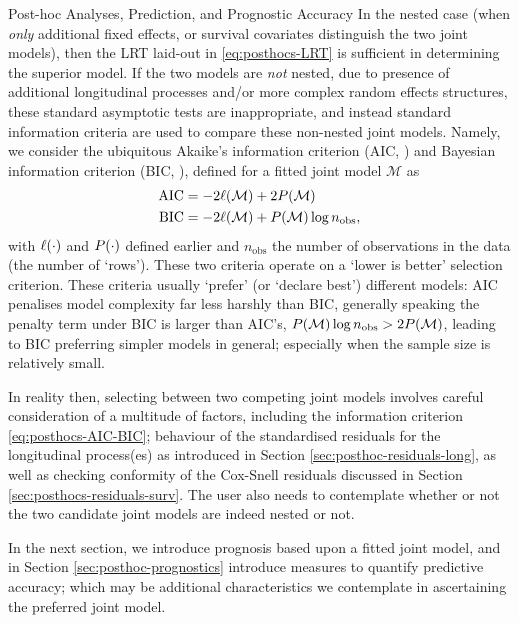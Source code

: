 \begin{chapter}{\label{cha:posthoc}Post-hoc Analyses, Prediction, and Prognostic Accuracy}
In the nested case (\eg when \textit{only} additional fixed effects, or survival covariates distinguish the two joint models), then the LRT laid-out in \eqref{eq:posthocs-LRT} is sufficient in determining the superior model. If the two models are \textit{not} nested, due to presence of additional longitudinal processes and/or more complex random effects structures, these standard asymptotic tests are inappropriate, and instead standard information criteria are used to compare these non-nested joint models. Namely, we consider the ubiquitous Akaike's information criterion (AIC, \citet{Akaike1974}) and Bayesian information criterion (BIC, \citet{Schwarz1978}), defined for a fitted joint model $\mathcal{M}$ as
\begin{equation}
    \begin{aligned}
        \mathrm{AIC} &= -2\ell\!\left(\cal M\right) + 2P\!\left(\cal M\right)\\
        \mathrm{BIC} &= -2\ell\!\left(\cal M\right) + P\!\left(\cal M\right)\log n_{\rm obs},
    \end{aligned}
\label{eq:posthocs-AIC-BIC}
\end{equation}
with $\ell\!\left(\cdot\right)$ and $P\!\left(\cdot\right)$ defined earlier and $n_{\mathrm{obs}}$ the number of observations in the data (\ie the number of `rows'). These two criteria operate on a `lower is better' selection criterion. These criteria usually `prefer' (or `declare best') different models: AIC penalises model complexity far less harshly than BIC, \ie generally speaking the penalty term under BIC is larger than AIC's, $P\!\left(\cal M\right)\log n_{\rm obs} > 2P\!\left(\cal M\right)$, leading to BIC preferring simpler models in general; especially when the sample size is relatively small.

In reality then, selecting between two competing joint models involves careful consideration of a multitude of factors, including the information criterion \eqref{eq:posthocs-AIC-BIC}; behaviour of the standardised residuals for the longitudinal process(es) as introduced in Section \ref{sec:posthoc-residuals-long}, as well as checking conformity of the Cox-Snell residuals discussed in Section \ref{sec:posthocs-residuals-surv}. The user also needs to contemplate whether or not the two candidate joint models are indeed nested or not. 

In the next section, we introduce prognosis based upon a fitted joint model, and in Section \ref{sec:posthoc-prognostics} introduce measures to quantify predictive accuracy; which may be additional characteristics we contemplate in ascertaining the preferred joint model.


\end{chapter}

